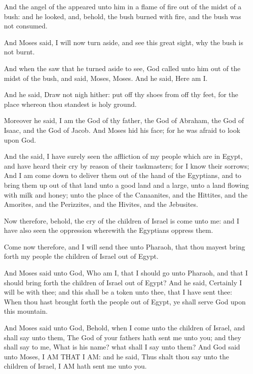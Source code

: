 \verse And the angel of the \LORD appeared unto him in a flame of fire out of the midst of a bush: and he looked, and, behold, the bush burned with fire, and the bush was not consumed.

\verse And Moses said, I will now turn aside, and see this great sight, why the bush is not burnt.

\verse And when the \LORD saw that he turned aside to see, God called unto him out of the midst of the bush, and said, Moses, Moses. And he said, Here am I.

\verse And he said, Draw not nigh hither: put off thy shoes from off thy feet, for the place whereon thou standest is holy ground.

\verse Moreover he said, I am the God of thy father, the God of Abraham, the God of Isaac, and the God of Jacob. And Moses hid his face; for he was afraid to look upon God.

\verse And the \LORD said, I have surely seen the affliction of my people which are in Egypt, and have heard their cry by reason of their taskmasters; for I know their sorrows; \verse And I am come down to deliver them out of the hand of the Egyptians, and to bring them up out of that land unto a good land and a large, unto a land flowing with milk and honey; unto the place of the Canaanites, and the Hittites, and the Amorites, and the Perizzites, and the Hivites, and the Jebusites.

\verse Now therefore, behold, the cry of the children of Israel is come unto me: and I have also seen the oppression wherewith the Egyptians oppress them.

\verse Come now therefore, and I will send thee unto Pharaoh, that thou mayest bring forth my people the children of Israel out of Egypt.

\verse And Moses said unto God, Who am I, that I should go unto Pharaoh, and that I should bring forth the children of Israel out of Egypt?  \verse And he said, Certainly I will be with thee; and this shall be a token unto thee, that I have sent thee: When thou hast brought forth the people out of Egypt, ye shall serve God upon this mountain.

\verse And Moses said unto God, Behold, when I come unto the children of Israel, and shall say unto them, The God of your fathers hath sent me unto you; and they shall say to me, What is his name? what shall I say unto them?  \verse And God said unto Moses, I AM THAT I AM: and he said, Thus shalt thou say unto the children of Israel, I AM hath sent me unto you.

